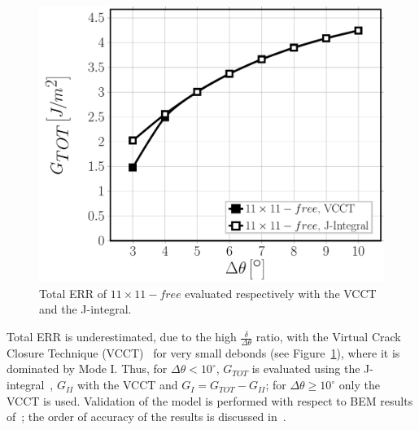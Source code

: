 \documentclass[12pt,a4paper]{article}
\begin{document}
\begin{figure}[!h]
\centering
        \includegraphics[height=0.3\textheight]{vf60-G-methodsaccuracy.pdf}
\caption{Total ERR of $11\times11-free$ evaluated respectively with the VCCT and the J-integral.}\label{fig:errerror}
\end{figure}

Total ERR is underestimated, due to the high $\frac{\delta}{\Delta\theta}$ ratio, with the Virtual Crack Closure Technique (VCCT)~\cite{Krueger2004} for very small debonds (see Figure~\ref{fig:errerror}), where it is dominated by Mode I. Thus, for $\Delta\theta<10^{\circ}$, $G_{TOT}$ is evaluated using the J-integral~\cite{Rice1968}, $G_{II}$ with the VCCT and $G_{I}=G_{TOT}-G_{II}$; for $\Delta\theta\geq10^{\circ}$ only the VCCT is used. Validation of the model is performed with respect to BEM results of~\cite{Paris2007,Sandino2016}; the order of accuracy of the results is discussed in~\cite{DiStasio2019}.
\end{document}
